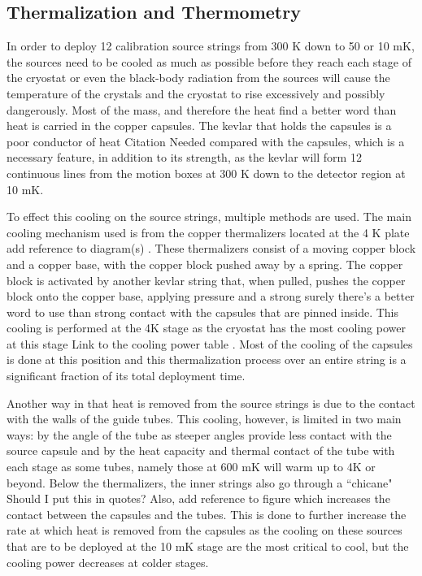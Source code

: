 \subsection{Thermalization and Thermometry}
In order to deploy 12 calibration source strings from 300 K down to 50 or 10 mK, the sources need to be cooled as much as possible before they reach each stage of the cryostat or even the black-body radiation from the sources will cause the temperature of the crystals and the cryostat to rise excessively and possibly dangerously. Most of the mass, and therefore the heat \color{red} find a better word than heat \color{black} is carried in the copper capsules. The kevlar that holds the capsules is a poor conductor of heat \color{red} Citation Needed \color{black} compared with the capsules, which is a necessary feature, in addition to its strength, as the kevlar will form 12 continuous lines from the motion boxes at 300 K down to the detector region at 10 mK.

To effect this cooling on the source strings, multiple methods are used. The main cooling mechanism used is from the copper thermalizers located at the 4 K plate \color{red} add reference to diagram(s) \color{black}. These thermalizers consist of a moving copper block and a copper base, with the copper block pushed away by a spring. The copper block is activated by another kevlar string that, when pulled, pushes the copper block onto the copper base, applying pressure and a strong \color{red} surely there's a better word to use than strong \color{black} contact with the capsules that are pinned inside. This cooling is performed at the 4K stage as the cryostat has the most cooling power at this stage \color{red} Link to the cooling power table \color{black}. Most of the cooling of the capsules is done at this position and this thermalization process over an entire string is a significant fraction of its total deployment time.

Another way in that heat is removed from the source strings is due to the contact with the walls of the guide tubes. This cooling, however, is limited in two main ways: by the angle of the tube as steeper angles provide less contact with the source capsule and by the heat capacity and thermal contact of the tube with each stage as some tubes, namely those at 600 mK will warm up to 4K or beyond. Below the thermalizers, the inner strings also go through a ``chicane" \color{red} Should I put this in quotes? Also, add reference to figure\color{black} which increases the contact between the capsules and the tubes. This is done to further increase the rate at which heat is removed from the capsules as the cooling on these sources that are to be deployed at the 10 mK stage are the most critical to cool, but the cooling power decreases at colder stages. 

